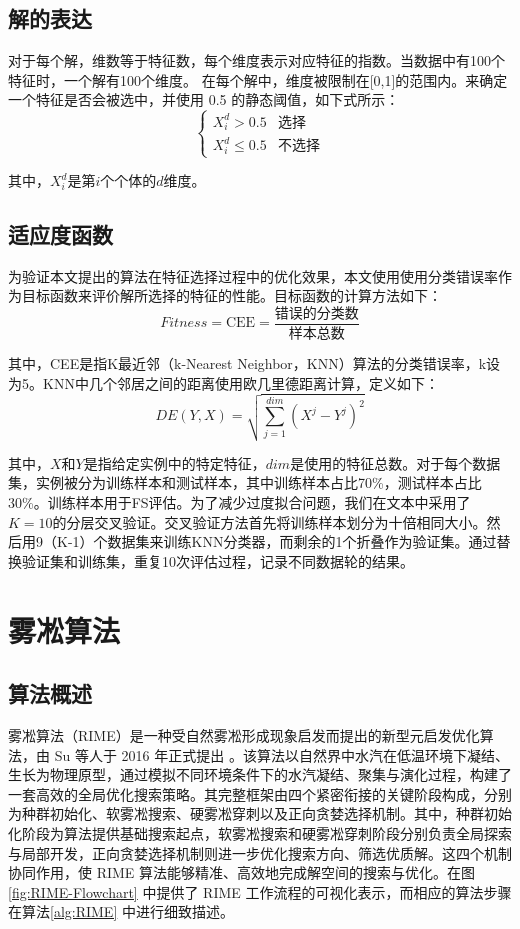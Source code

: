 \documentclass{wzuthesis}
\begin{document}
\subsection{解的表达}

对于每个解，维数等于特征数，每个维度表示对应特征的指数。当数据中有100个特征时，一个解有100个维度。
在每个解中，维度被限制在[0,1]的范围内。来确定一个特征是否会被选中，并使用 0.5 的静态阈值，如下式所示：
\begin{equation}
\begin{cases}
X_i^d > 0.5 & \text{选择} \\
X_i^d \leq 0.5 & \text{不选择}
\end{cases}
\end{equation}

其中，$X_i^d$是第$i$个个体的$d$维度。
\subsection{适应度函数}
为验证本文提出的算法在特征选择过程中的优化效果，本文使用使用分类错误率作为目标函数来评价解所选择的特征的性能。目标函数的计算方法如下：
\begin{equation}
Fitness = \text{CEE} = \frac{\text{错误的分类数}}{\text{样本总数}}
\end{equation}

其中，CEE是指K最近邻（k-Nearest Neighbor，KNN）算法的分类错误率，k设为5。KNN中几个邻居之间的距离使用欧几里德距离计算，定义如下：
\begin{equation}
DE(Y,X) = \sqrt{\sum_{j=1}^{dim} \left( X^j - Y^j \right)^2}
\end{equation}

其中，$X$和$Y$是指给定实例中的特定特征，$dim$是使用的特征总数。对于每个数据集，实例被分为训练样本和测试样本，其中训练样本占比70\%，测试样本占比30\%。训练样本用于FS评估。为了减少过度拟合问题，我们在文本中采用了$K=10$的分层交叉验证。交叉验证方法首先将训练样本划分为十倍相同大小。然后用9（K-1）个数据集来训练KNN分类器，而剩余的1个折叠作为验证集。通过替换验证集和训练集，重复10次评估过程，记录不同数据轮的结果。
\section{雾凇算法}
\subsection{算法概述}
雾凇算法（RIME）是一种受自然雾凇形成现象启发而提出的新型元启发优化算法，由 Su 等人于 2016 年正式提出 。该算法以自然界中水汽在低温环境下凝结、生长为物理原型，通过模拟不同环境条件下的水汽凝结、聚集与演化过程，构建了一套高效的全局优化搜索策略。其完整框架由四个紧密衔接的关键阶段构成，分别为种群初始化、软雾凇搜索、硬雾凇穿刺以及正向贪婪选择机制。其中，种群初始化阶段为算法提供基础搜索起点，软雾凇搜索和硬雾凇穿刺阶段分别负责全局探索与局部开发，正向贪婪选择机制则进一步优化搜索方向、筛选优质解。这四个机制协同作用，使 RIME 算法能够精准、高效地完成解空间的搜索与优化。在图\ref{fig:RIME-Flowchart} 中提供了 RIME 工作流程的可视化表示，而相应的算法步骤在算法\ref{alg:RIME} 中进行细致描述。
\end{document}
